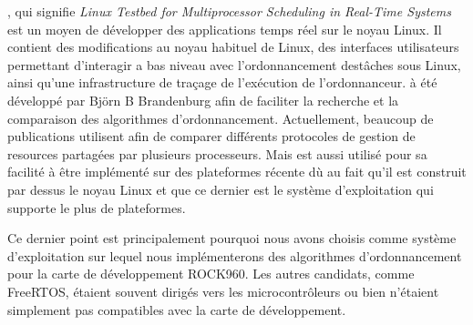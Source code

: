 \litmus, qui signifie \textit{Linux Testbed for Multiprocessor Scheduling in Real-Time Systems} est un moyen de développer des applications temps réel sur le noyau Linux. Il contient des modifications au noyau habituel de Linux, des interfaces utilisateurs permettant d’interagir a bas niveau avec l’ordonnancement destâches sous Linux, ainsi qu'une infrastructure de traçage de l'exécution de l’ordonnanceur.
\litmus à été développé par Björn B Brandenburg \cite{brandenburg2011scheduling} afin de faciliter la recherche et la comparaison des algorithmes d'ordonnancement. Actuellement, beaucoup de publications utilisent \litmus afin de comparer différents protocoles de gestion de resources partagées par plusieurs processeurs. Mais \litmus est aussi utilisé pour sa facilité à être implémenté sur des plateformes récente dù au fait qu'il est construit par dessus le noyau Linux et que ce dernier est le système d'exploitation qui supporte le plus de plateformes. 

Ce dernier point est principalement pourquoi nous avons choisis \litmus comme système d'exploitation sur lequel nous implémenterons des algorithmes d’ordonnancement pour la carte de développement ROCK960. Les autres candidats, comme FreeRTOS, étaient souvent dirigés vers les microcontrôleurs ou bien n'étaient simplement pas compatibles avec la carte de développement. 